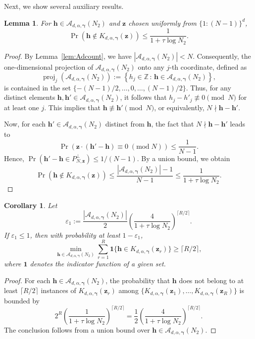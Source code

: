 \documentclass[a4paper,11pt]{article}
\newtheorem{lemma}[theorem]{Lemma}
\newtheorem{corollary}[theorem]{Corollary}
\newcommand{\bsh}{\boldsymbol{h}}
\newcommand{\bsz}{\boldsymbol{z}}
\newcommand{\bsgamma}{\boldsymbol{\gamma}}
\newcommand{\ZZ}{\mathbb{Z}}
\newcommand{\Acal}{\mathcal{A}}
\newcommand{\tmod}[1]{{\;(\mathrm{mod}\; #1)}}
\newcommand{\bsone}{\boldsymbol{1}}
\DeclareMathOperator{\proj}{proj}
\begin{document}
Next, we show several auxiliary results.
\begin{lemma}\label{lem:reconstruction}
    For $\bsh\in \Acal_{d,\alpha,\bsgamma}(N_2) $ and $\bsz$ chosen uniformly from  $\{1{:}(N-1)\}^d$, 
    $$\Pr(\bsh\notin K_{d,\alpha,\bsgamma}(\bsz) )\leq \frac{1}{1+\tau\log N_2}.$$
\end{lemma}
\begin{proof}
    By Lemma~\ref{lem:Adcount}, we have $|\Acal_{d,\alpha,\bsgamma}(N_2)|<N$. Consequently, the one-dimensional projection of $\Acal_{d,\alpha,\bsgamma}(N_2)$ onto any $j$-th coordinate, defined as
    \[ \proj_j (\Acal_{d,\alpha,\bsgamma}(N_2)) := \left\{ h_j\in \ZZ \,:\,  \bsh\in \Acal_{d,\alpha,\bsgamma}(N_2) \right\}, \]
    is contained in the set $\{-(N-1)/2,\ldots,0,\ldots,(N-1)/2\}$. Thus, for any distinct elements $\bsh,\bsh'\in \Acal_{d,\alpha,\bsgamma}(N_2)$, it follows that $h_j-h'_j \not\equiv 0 \pmod N$ for at least one $j$. This implies that $\bsh\not\equiv \bsh' \pmod N$, or equivalently, $N\nmid \bsh-\bsh'$.
    
    
    Now, for each $\bsh'\in \Acal_{d,\alpha,\bsgamma}(N_2) $ distinct from $\bsh$, the fact that $N\nmid \bsh-\bsh'$ leads to
    $$\Pr\left(\bsz\cdot (\bsh'-\bsh)\equiv 0 \tmod N  \right)\leq \frac{1}{N-1}.$$
    Hence, $\Pr(\bsh'-\bsh\in P^\perp_{N,\bsz})\leq 1/(N-1)$. By a union bound, we obtain
    $$\Pr(\bsh\notin K_{d,\alpha,\bsgamma}(\bsz))\leq \frac{| \Acal_{d,\alpha,\bsgamma}(N_2)|-1}{N-1}\leq\frac{1}{1+\tau\log N_2}.$$
\end{proof}

\begin{corollary}\label{cor:whp}
    Let 
    \begin{equation}\label{eqn:failprob}
      \varepsilon_1:=\frac{|\Acal_{d,\alpha,\bsgamma}(N_2)|}{2}\left(\frac{4}{1+\tau\log N_2}\right)^{\lceil R/2 \rceil}.  
    \end{equation}
    If $ \varepsilon_1\leq 1$, then with probability at least $1- \varepsilon_1$, 
    $$
    \min_{\bsh\in \Acal_{d,\alpha,\bsgamma}(N_2)} \sum_{r=1}^R \bsone\{\bsh\in K_{d,\alpha,\bsgamma}(\bsz_r)\}\geq \lceil R/2 \rceil,
    $$
    where $\bsone$ denotes the indicator function of a given set.
\end{corollary}
\begin{proof}
    For each $\bsh\in \Acal_{d,\alpha,\bsgamma}(N_2) $, the probability that $\bsh$ does not belong to at least $\lceil R/2 \rceil$ instances of $K_{d,\alpha,\bsgamma}(\bsz_r)$ among $\{K_{d,\alpha,\bsgamma}(\bsz_1),\dots,K_{d,\alpha,\bsgamma}(\bsz_R)\}$ is bounded by
    $$2^R\left(\frac{1}{1+\tau\log N_2}\right)^{\lceil R/2 \rceil}=\frac{1}{2} \left(\frac{4}{1+\tau\log N_2}\right)^{\lceil R/2 \rceil} .$$
    The conclusion follows from a union bound over $\bsh\in \Acal_{d,\alpha,\bsgamma}(N_2) $.
\end{proof}
\end{document}

